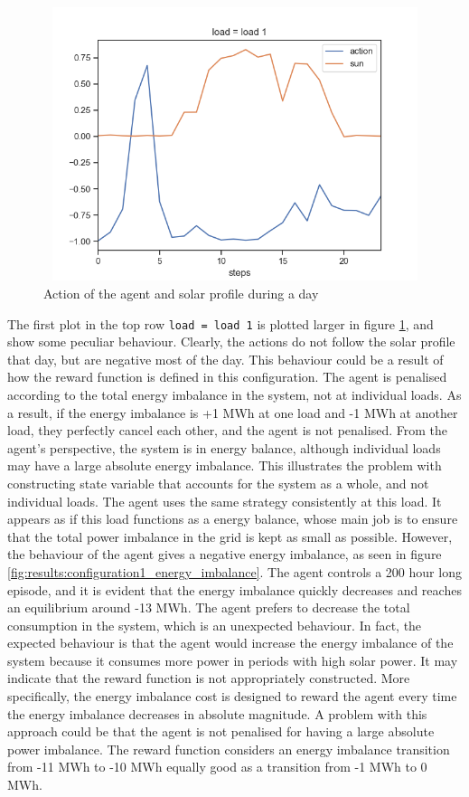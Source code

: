 \documentclass[class=book, crop=false]{standalone}
\begin{document}
\begin{figure}[ht]
    \center
\includegraphics[height=8cm, width=12cm]{figures/configuration1_negative_actions.png}
    \caption[size = 9]{Action of the agent and solar profile during a day}
    \label{fig:results:configuration1_negative_actions}
\end{figure}

 The first plot in the top row \texttt{load = load 1} is plotted larger in figure \ref{fig:results:configuration1_negative_actions}, and show some peculiar behaviour. Clearly, the actions do not follow the solar profile that day, but are negative most of the day. This behaviour could be a result of how the reward function is defined in this configuration. The agent is penalised according to the total energy imbalance in the system, not at individual loads. As a result, if the energy imbalance is +1 MWh at one load and -1 MWh at another load, they perfectly cancel each other, and the agent is not penalised. From the agent's perspective, the system is in energy balance, although individual loads may have a large absolute energy imbalance. This illustrates the problem with constructing state variable that accounts for the system as a whole, and not individual loads. The agent uses the same strategy consistently at this load. It appears as if this load functions as a energy balance, whose main job is to ensure that the total power imbalance in the grid is kept as small as possible. However, the behaviour of the agent gives a negative energy imbalance, as seen in figure \ref{fig:results:configuration1_energy_imbalance}. The agent controls a 200 hour long episode, and it is evident that the energy imbalance quickly decreases and reaches an equilibrium around -13 MWh. The agent prefers to decrease the total consumption in the system, which is an unexpected behaviour. In fact, the expected behaviour is that the agent would increase the energy imbalance of the system because it consumes more power in periods with high solar power. It may indicate that the reward function is not appropriately constructed. More specifically, the energy imbalance cost is designed to reward the agent every time the energy imbalance decreases in absolute magnitude. A problem with this approach could be that the agent is not penalised for having a large absolute power imbalance. The reward function considers an energy imbalance transition from -11 MWh to -10 MWh equally good as a transition from -1 MWh to 0 MWh.
 
\end{document}

